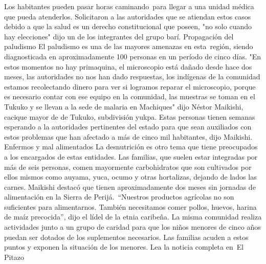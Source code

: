 \documentclass{article}%
\begin{document}
\newline%
%
Los habitantes pueden pasar horas caminando~para llegar a una unidad médica que pueda atenderlos. Solicitaron a las autoridades que se atiendan estos casos debido a que la salud es un derecho constitucional que poseen, "no solo cuando hay elecciones" dijo un de los integrantes del grupo barí.%
\newline%
%
Propagación del paludismo%
\newline%
%
El paludismo es una de las mayores amenazas en esta~región, siendo diagnosticada en aproximadamente 100 personas en un período de cinco días. "En estos momentos no hay primaquina, el microscopio está dañado desde hace dos meses, las autoridades no nos han dado respuestas, los indígenas de la comunidad estamos recolectando dinero para ver si logramos reparar el microscopio, porque es necesario contar con ese equipo en la comunidad, las muestras se toman en el Tukuko y se llevan a la sede de malaria en Machiques" dijo Néstor Maikishi, cacique mayor de de Tukuko, subdivisión yukpa.%
\newline%
%
Estas personas tienen semanas esperando a la autoridades pertinentes del estado para que sean auxiliados con estos problemas que han afectado a más de cinco mil habitantes, dijo Maikishi.%
\newline%
%
Enfermos y mal alimentados%
\newline%
%
La desnutrición es otro tema que tiene preocupados a los encargados de estas entidades. Las familias, que suelen estar integradas por más de seis personas, comen mayormente carbohidratos que son cultivados por ellos mismos como auyama, yuca, ocumo y otras hortalizas, dejando de lados las carnes.%
\newline%
%
Maikishi destacó que tienen aproximadamente dos meses sin jornadas de alimentación en la Sierra de Perijá.~“Nuestros productos agrícolas no son suficientes para alimentarnos. También necesitamos comer pollos, huevos, harina de maíz precocida”, dijo el lídel de la etnia caribeña.%
\newline%
%
La misma comunidad realiza actividades junto a un grupo de caridad para que los niños menores de cinco años puedan ser dotados de los suplementos necesarios. Las familias acuden a estos puntos y exponen la situación de los menores.%
\newline%
%
Lea la noticia completa en~El Pitazo%
\newline%
%
\end{document}
